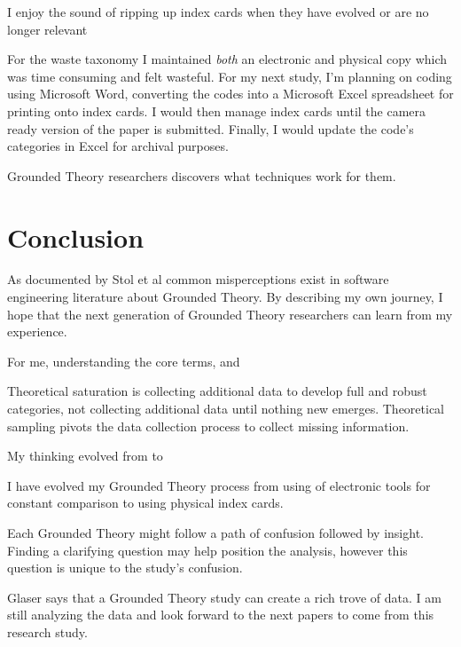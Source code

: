 I enjoy the sound of ripping up index cards when they have evolved or are no longer relevant

For the waste taxonomy I maintained \textit{both} an electronic and physical copy which was time consuming and felt wasteful. For my next study, I’m planning on coding using Microsoft Word, converting the codes into a Microsoft Excel spreadsheet for printing onto index cards. I would then manage index cards until the camera ready version of the paper is submitted. Finally, I would update the code’s categories in Excel for archival purposes.

Grounded Theory researchers discovers what techniques work for them. 
\section{Conclusion}
As documented by Stol et al \cite{StolGroundedTheory} common misperceptions exist in software engineering literature about Grounded Theory. By describing my own journey, I hope that the next generation of Grounded Theory researchers can learn from my experience. 

For me, understanding the core terms,  and  

Theoretical saturation is collecting additional data to develop full and robust categories, not collecting additional data until nothing new emerges. Theoretical sampling pivots the data collection process to collect missing information. 

My thinking evolved from  to 

I have evolved my Grounded Theory process from using of electronic tools for constant comparison to using physical index cards.

Each Grounded Theory might follow a path of confusion followed by insight. Finding a clarifying question may help position the analysis, however this question is unique to the study’s confusion.

Glaser says that a Grounded Theory study can create a rich trove of data. I am still analyzing the data and look forward to the next papers to come from this research study.
















